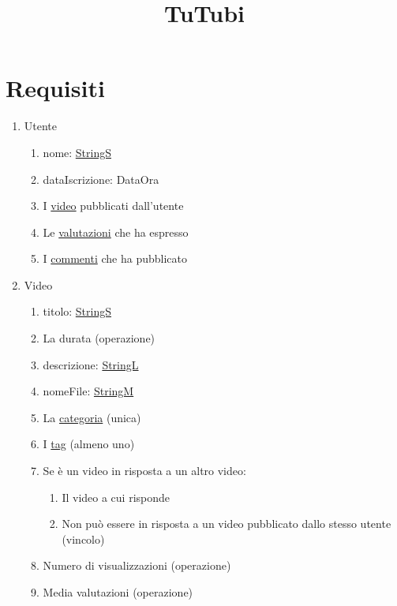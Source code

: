 \documentclass{article}
\title{TuTubi}
\author{}
\date{}
\begin{document}
\maketitle

\tableofcontents

\newpage
\section{\label{sec:Requisiti}Requisiti}
\begin{enumerate}
    \item\label{sec:RequisitiUtente} Utente
    \begin{enumerate}
        \item nome: \hyperref[sec:TipoStringS]{StringS}
        \item dataIscrizione: DataOra
        \item I \hyperref[sec:RequisitiVideo]{video} pubblicati dall'utente
        \item Le \hyperref[sec:RequisitiValutazione]{valutazioni} che ha espresso
        \item I \hyperref[sec:RequisitiCommento]{commenti} che ha pubblicato
    \end{enumerate}
    \item\label{sec:RequisitiVideo} Video
    \begin{enumerate}
        \item titolo: \hyperref[sec:TipoStringS]{StringS}
        \item La durata (operazione)
        \item descrizione: \hyperref[sec:TipoStringL]{StringL}
        \item nomeFile: \hyperref[sec:TipoStringM]{StringM}
        \item La \hyperref[sec:RequisitiCategoria]{categoria} (unica)
        \item I \hyperref[sec:RequisitiTag]{tag} (almeno uno)
        \item Se è un video in risposta a un altro video:
        \begin{enumerate}
            \item Il video a cui risponde
            \item Non può essere in risposta a un video pubblicato dallo stesso utente (vincolo)
        \end{enumerate}
        \item Numero di visualizzazioni (operazione)
        \item Media valutazioni (operazione)

\end{enumerate}
\end{enumerate}
\end{document}
